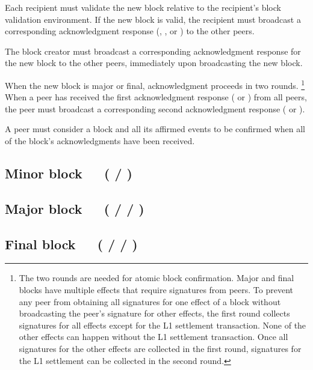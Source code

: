 \documentclass[../hydrozoa.tex]{subfiles}
\begin{document}
Each recipient must validate the new block relative to the recipient's block validation environment. If the new block is valid, the recipient must broadcast a corresponding acknowledgment response (, , or ) to the other peers.

The block creator must broadcast a corresponding acknowledgment response for the new block to the other peers, immediately upon broadcasting the new block.

When the new block is major or final, acknowledgment proceeds in two rounds.%
\footnote{The two rounds are needed for atomic block confirmation.
  Major and final blocks have multiple effects that require signatures from peers.
  To prevent any peer from obtaining all signatures for one effect of a block without broadcasting the peer's signature for other effects, the first round collects signatures for all effects except for the L1 settlement transaction.
  None of the other effects can happen without the L1 settlement transaction.
  Once all signatures for the other effects are collected in the first round, signatures for the L1 settlement can be collected in the second round.
  }
When a peer has received the first acknowledgment response ( or ) from all peers, the peer must broadcast a corresponding second acknowledgment response ( or ).

A peer must consider a block and all its affirmed events to be confirmed when all of the block's acknowledgments have been received.

\subsection{Minor block~~~( / )}%
\label{h:l2-consensus-minor-block}%


\subsection{Major block~~~( /  / )}%
\label{h:l2-consensus-major-block}%


\subsection{Final block~~~( /  / )}%
\label{h:l2-consensus-final-block}%
\end{document}
